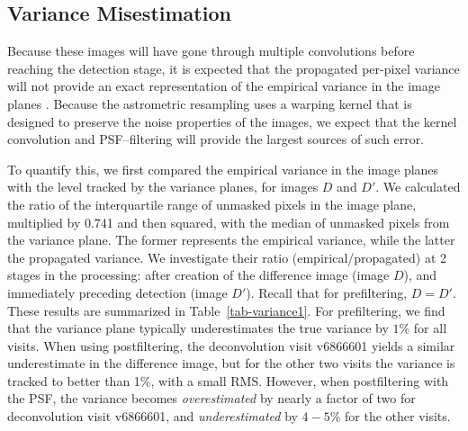 \documentclass[prd, nofootinbib, floatfix, 11pt,tightenlines,times]{article}
\begin{document}
\subsection{Variance Misestimation \label{sec-varmis}}


Because these images will have gone through multiple convolutions
before reaching the detection stage, it is expected that the
propagated per-pixel variance will not provide an exact representation
of the empirical variance in the image planes \citep{Price-Stacking}.
Because the astrometric resampling uses a warping kernel that is
designed to preserve the noise properties of the images, we expect
that the kernel convolution and PSF--filtering will provide the largest
sources of such error.

To quantify this, we first compared the empirical variance in
the image planes with the level tracked by the variance planes, for images $D$ and $D'$.  We
calculated the ratio of the interquartile range of unmasked pixels in
the image plane, multiplied by 0.741 and then squared, with the median
of unmasked pixels from the variance plane.  The former represents the
empirical variance, while the latter the propagated variance.  We
investigate their ratio (empirical/propagated) at 2 stages in the
processing: after creation of the difference image (image $D$), and
immediately preceding detection (image $D'$).  Recall that for
prefiltering, $D = D'$.  These results are summarized in
Table~\ref{tab-variance1}.  For prefiltering, we find that the
variance plane typically underestimates the true variance by $1\%$ for
all visits.  When using postfiltering, the deconvolution visit
v6866601 yields a similar underestimate in the difference image, but
for the other two visits the variance is tracked to better than 1\%,
with a small RMS.  However, when postfiltering with the PSF, the
variance becomes {\it overestimated} by nearly a factor of two for
deconvolution visit v6866601, and {\it underestimated} by $4-5\%$ for
the other visits.
\end{document}
